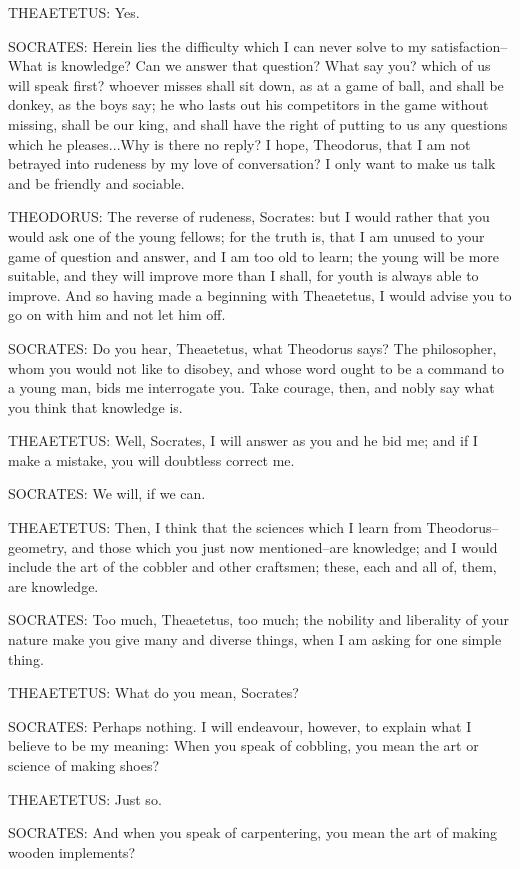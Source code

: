 THEAETETUS: Yes.

SOCRATES: Herein lies the difficulty which I can never solve to my
satisfaction--What is knowledge? Can we answer that question? What say
you? which of us will speak first? whoever misses shall sit down, as at
a game of ball, and shall be donkey, as the boys say; he who lasts out
his competitors in the game without missing, shall be our king,
and shall have the right of putting to us any questions which he
pleases...Why is there no reply? I hope, Theodorus, that I am not
betrayed into rudeness by my love of conversation? I only want to make
us talk and be friendly and sociable.

THEODORUS: The reverse of rudeness, Socrates: but I would rather that
you would ask one of the young fellows; for the truth is, that I am
unused to your game of question and answer, and I am too old to learn;
the young will be more suitable, and they will improve more than
I shall, for youth is always able to improve. And so having made a
beginning with Theaetetus, I would advise you to go on with him and not
let him off.

SOCRATES: Do you hear, Theaetetus, what Theodorus says? The philosopher,
whom you would not like to disobey, and whose word ought to be a command
to a young man, bids me interrogate you. Take courage, then, and nobly
say what you think that knowledge is.

THEAETETUS: Well, Socrates, I will answer as you and he bid me; and if I
make a mistake, you will doubtless correct me.

SOCRATES: We will, if we can.

THEAETETUS: Then, I think that the sciences which I learn from
Theodorus--geometry, and those which you just now mentioned--are
knowledge; and I would include the art of the cobbler and other
craftsmen; these, each and all of, them, are knowledge.

SOCRATES: Too much, Theaetetus, too much; the nobility and liberality of
your nature make you give many and diverse things, when I am asking for
one simple thing.

THEAETETUS: What do you mean, Socrates?

SOCRATES: Perhaps nothing. I will endeavour, however, to explain what I
believe to be my meaning: When you speak of cobbling, you mean the art
or science of making shoes?

THEAETETUS: Just so.

SOCRATES: And when you speak of carpentering, you mean the art of making
wooden implements?

